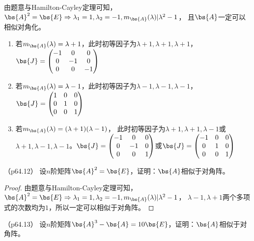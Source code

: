 \documentclass[12pt, a4paper, oneside, UTF8]{ctexbook}
\begin{document}
\begin{solution}
    由题意与Hamilton-Cayley定理可知，$\bs{A}^2=\bs{E} \Rightarrow \lambda_1=1,\lambda_2=-1,m_{\bs{A}}(\lambda)|\lambda^2-1$，
    且$\bs{A}$一定可以相似对角化。
    \begin{enumerate}[label=(\arabic*)]
        \item 若$m_{\bs{A}}(\lambda)=\lambda+1$，此时初等因子为$\lambda+1,\lambda+1,\lambda+1$，$\bs{J}=\begin{pmatrix}
            -1 &0 &0\\
            0 &-1 &0\\
            0 &0 &-1
        \end{pmatrix}$
        \item 若$m_{\bs{A}}(\lambda)=\lambda-1$，此时初等因子为$\lambda-1,\lambda-1,\lambda-1$，$\bs{J}=\begin{pmatrix}
            1 &0 &0\\
            0 &1 &0\\
            0 &0 &1
        \end{pmatrix}$
        \item 若$m_{\bs{A}}(\lambda)=(\lambda+1)(\lambda-1)$，
        此时初等因子为$\lambda+1,\lambda+1,\lambda-1$或$\lambda+1,\lambda-1,\lambda-1$。$\bs{J}=\begin{pmatrix}
        -1 &0 &0\\
        0 &-1 &0\\
        0 &0 &1
    \end{pmatrix}$或$\bs{J}=\begin{pmatrix}
        -1 &0 &0\\
        0 &1 &0\\
        0 &0 &1
    \end{pmatrix}$
    \end{enumerate}
\end{solution}

\begin{question}（p64.12）
    设$n$阶矩阵$\bs{A}^2=\bs{E}$，证明：$\bs{A}$相似于对角阵。
\end{question}

\begin{proof}
    由题意与Hamilton-Cayley定理可知，$\bs{A}^2=\bs{E} \Rightarrow \lambda_1=1,\lambda_2=-1,m_{\bs{A}}(\lambda)|\lambda^2-1$，
    $\lambda-1,\lambda+1$两个多项式的次数均为$1$，所以一定可以相似于对角阵。
\end{proof}

\begin{question}（p64.13）
    设$n$阶矩阵$\bs{A}^3-\bs{A}=10\bs{E}$，证明：$\bs{A}$相似于对角阵。
\end{question}
\end{document}
